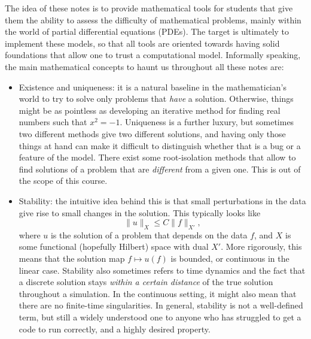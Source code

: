 The idea of these notes is to provide mathematical tools for students that give them the ability to assess the difficulty of mathematical problems, mainly within the world of partial differential equations (PDEs). The target is ultimately to implement these models, so that all tools are oriented towards having solid foundations that allow one to trust a computational model. Informally speaking, the main mathematical concepts to haunt us throughout all these notes are: 
\begin{itemize}
    \item Existence and uniqueness: it is a natural baseline in the mathematician's world to try to solve only problems that \emph{have} a solution. Otherwise, things might be as pointless as developing an iterative method for finding real numbers such that $x^2 = -1$. Uniqueness is a further luxury, but sometimes two different methods give two different solutions, and having only those things at hand can make it difficult to distinguish whether that is a bug or a feature of the model. There exist some root-isolation methods that allow to find solutions of a problem that are \emph{different} from a given one. This is out of the scope of this course. 
    \item Stability: the intuitive idea behind this is that small perturbations in the data give rise to small changes in the solution. This typically looks like 
    \begin{equation*}
        \| u\|_X \leq C\| f\|_{X'},
    \end{equation*}
    where $u$ is the solution of a problem that depends on the data $f$, and $X$ is some functional (hopefully Hilbert) space with dual $X'$. More rigorously, this means that the solution map $f \mapsto u(f)$ is bounded, or continuous in the linear case. Stability also sometimes refers to time dynamics and the fact that a discrete solution stays \emph{within a certain distance} of the true solution throughout a simulation. In the continuous setting, it might also mean that there are no finite-time singularities. In general, stability is not a well-defined term, but still a widely understood one to anyone who has struggled to get a code to run correctly, and a highly desired property. 
\end{itemize}
